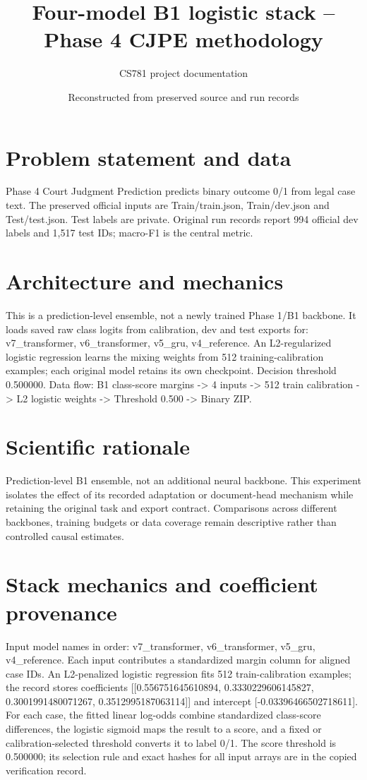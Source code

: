 \documentclass[11pt,a4paper]{article}
\begin{document}
\title{Four-model B1 logistic stack -- Phase 4 CJPE methodology}
\author{CS781 project documentation}
\date{Reconstructed from preserved source and run records}
\maketitle
\section{Problem statement and data}
Phase 4 Court Judgment Prediction predicts binary outcome 0/1 from legal case text. The preserved official inputs are Train/train.json, Train/dev.json and Test/test.json. Test labels are private. Original run records report 994 official dev labels and 1,517 test IDs; macro-F1 is the central metric.
\section{Architecture and mechanics}
This is a prediction-level ensemble, not a newly trained Phase 1/B1 backbone. It loads saved raw class logits from calibration, dev and test exports for: v7\_transformer, v6\_transformer, v5\_gru, v4\_reference. An L2-regularized logistic regression learns the mixing weights from 512 training-calibration examples; each original model retains its own checkpoint. Decision threshold 0.500000. Data flow: B1 class-score margins -> 4 inputs -> 512 train calibration -> L2 logistic weights -> Threshold 0.500 -> Binary ZIP.
\section{Scientific rationale}
Prediction-level B1 ensemble, not an additional neural backbone. This experiment isolates the effect of its recorded adaptation or document-head mechanism while retaining the original task and export contract. Comparisons across different backbones, training budgets or data coverage remain descriptive rather than controlled causal estimates.
\section{Stack mechanics and coefficient provenance}
Input model names in order: v7\_transformer, v6\_transformer, v5\_gru, v4\_reference. Each input contributes a standardized margin column for aligned case IDs. An L2-penalized logistic regression fits 512 train-calibration examples; the record stores coefficients [[0.556751645610894, 0.3330229606145827, 0.3001991480071267, 0.3512995187063114]] and intercept [-0.03396466502718611]. For each case, the fitted linear log-odds combine standardized class-score differences, the logistic sigmoid maps the result to a score, and a fixed or calibration-selected threshold converts it to label 0/1. The score threshold is 0.500000; its selection rule and exact hashes for all input arrays are in the copied verification record.
\end{document}
